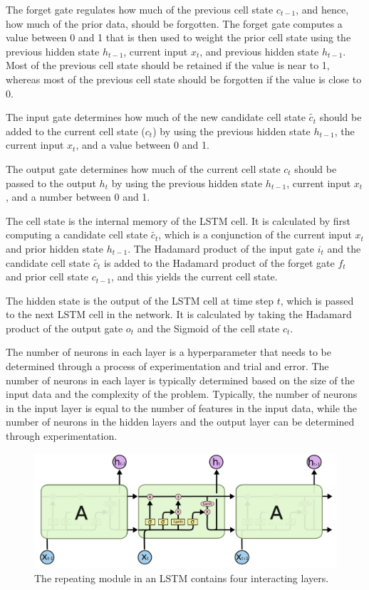 \documentclass[a4paper]{article}
\begin{document}
The forget gate regulates how much of the previous cell state $c_{t-1}$, and hence, how much of the prior data, should be forgotten. The forget gate computes a value between 0 and 1 that is then used to weight the prior cell state using the previous hidden state $h_{t-1}$, current input $x_{t}$, and previous hidden state $h_{t-1}$. Most of the previous cell state should be retained if the value is near to 1, whereas most of the previous cell state should be forgotten if the value is close to 0.

The input gate determines how much of the new candidate cell state $\tilde{c_{t}}$ should be added to the current cell state ($c_{t}$) by using the previous hidden state $h_{t-1}$, the current input $x_{t}$, and a value between 0 and 1.

The output gate determines how much of the current cell state $c_t$ should be passed to the output $h_{t}$ by using the previous hidden state $h_{t-1}$, current input $x_{t}$, and a number between 0 and 1.

The cell state is the internal memory of the LSTM cell. It is calculated by first computing a candidate cell state $\tilde{c_{t}}$, which is a conjunction of the current input $x_{t}$ and prior hidden state $h_{t-1}$. The Hadamard product of the input gate $i_{t}$ and the candidate cell state $\tilde{c_{t}}$ is added to the Hadamard product of the forget gate $f_{t}$ and prior cell state $c_{t-1}$, and this yields the current cell state.

The hidden state is the output of the LSTM cell at time step $t$, which is passed to the next LSTM cell in the network. It is calculated by taking the Hadamard product of the output gate $o_{t}$ and the Sigmoid of the cell state $c_{t}$.

The number of neurons in each layer is a hyperparameter that needs to be determined through a process of experimentation and trial and error. The number of neurons in each layer is typically determined based on the size of the input data and the complexity of the problem. Typically, the number of neurons in the input layer is equal to the number of features in the input data, while the number of neurons in the hidden layers and the output layer can be determined through experimentation.

\begin{center}
\begin{figure}[!h]
    \centering
    \includegraphics[width=14cm]{lstm.png}
    \caption{The repeating module in an LSTM contains four interacting layers.}
    \label{fig:my_label}
\end{figure}
\end{center}
\end{document}
